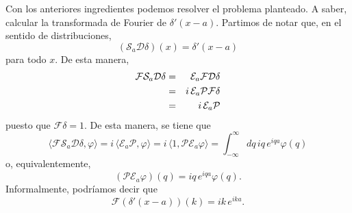 \documentclass[11pt,spanish]{article}
\newcommand{\four}{\mathcal{F}}
\newcommand{\powr}{\mathcal{P}}
\newcommand{\derv}{\mathcal{D}}
\newcommand{\tras}{\mathcal{S}}
\newcommand{\phas}{\mathcal{E}}
\newcounter{problema}
\begin{document}
Con los anteriores ingredientes podemos resolver el problema planteado.
A saber, calcular la transformada de Fourier de $\delta'(x-a)$.
Partimos de notar que, en el sentido de distribuciones,
$$
(\tras_a \derv \delta)(x)
=
\delta'(x-a)
$$
para todo $x$.
De esta manera,
\begin{eqnarray}
\four \tras_a \derv \delta 
&=&
\phas_a \four \derv \delta 
\notag
\\
&=&
i\, \phas_a \powr \four \delta 
\notag
\\
&=&
i\, \phas_a \powr
\notag
\end{eqnarray}
puesto que $\four \delta = 1$.
De esta manera, se tiene que
$$
\langle 
\four \tras_a \derv \delta,
\varphi
\rangle
=
i\, 
\langle
\phas_a 
\powr
,
\varphi
\rangle
=
i\,
\langle
1
,
\powr
\phas_a 
\varphi
\rangle
=
\int_{-\infty}^{\infty}
dq\,
iq\,
e^{iqa}
\varphi(q)
$$
o, equivalentemente,
$$
(
\powr
\phas_a 
\varphi
)(q)
=
iq\,
e^{iqa}
\varphi(q)
.
$$
Informalmente, podr\'iamos decir que 
$$
\four
(\delta'(x-a))(k)
=
ik\,e^{ika}
.
$$
\end{document}
